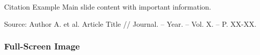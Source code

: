\documentclass[10pt]{beamer}  %
\begin{document}
\begin{frame}{Citation Example}
    Main slide content with important information.
    
    \vspace{1em}
    
    \tiny Source: Author A. et al. Article Title // Journal. – Year. – Vol. X. – P. XX-XX.
\end{frame}

\begin{frame}[plain]
    \frametitle{Full-Screen Image}
\end{frame}
\end{document}
